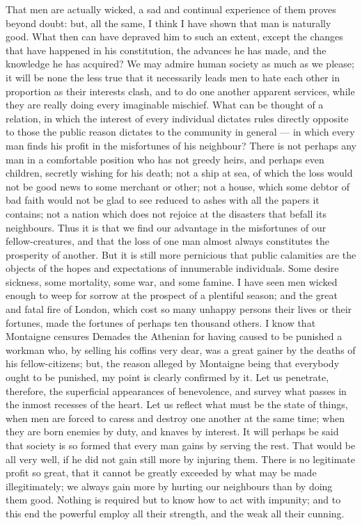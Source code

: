\documentclass[12pt]{report}
\begin{document}
 That men are actually wicked, a sad and continual experience of them proves beyond doubt: but, all the same, I think I have shown that man is naturally good. What then can have depraved him to such an extent, except the changes that have happened in his constitution, the advances he has made, and the knowledge he has acquired? We may admire human society as much as we please; it will be none the less true that it necessarily leads men to hate each other in proportion as their interests clash, and to do one another apparent services, while they are really doing every imaginable mischief. What can be thought of a relation, in which the interest of every individual dictates rules directly opposite to those the public reason dictates to the community in general — in which every man finds his profit in the misfortunes of his neighbour? There is not perhaps any man in a comfortable position who has not greedy heirs, and perhaps even children, secretly wishing for his death; not a ship at sea, of which the loss would not be good news to some merchant or other; not a house, which some debtor of bad faith would not be glad to see reduced to ashes with all the papers it contains; not a nation which does not rejoice at the disasters that befall its neighbours. Thus it is that we find our advantage in the misfortunes of our fellow-creatures, and that the loss of one man almost always constitutes the prosperity of another. But it is still more pernicious that public calamities are the objects of the hopes and expectations of innumerable individuals. Some desire sickness, some mortality, some war, and some famine. I have seen men wicked enough to weep for sorrow at the prospect of a plentiful season; and the great and fatal fire of London, which cost so many unhappy persons their lives or their fortunes, made the fortunes of perhaps ten thousand others. I know that Montaigne censures Demades the Athenian for having caused to be punished a workman who, by selling his coffins very dear, was a great gainer by the deaths of his fellow-citizens; but, the reason alleged by Montaigne being that everybody ought to be punished, my point is clearly confirmed by it. Let us penetrate, therefore, the superficial appearances of benevolence, and survey what passes in the inmost recesses of the heart. Let us reflect what must be the state of things, when men are forced to caress and destroy one another at the same time; when they are born enemies by duty, and knaves by interest. It will perhaps be said that society is so formed that every man gains by serving the rest. That would be all very well, if he did not gain still more by injuring them. There is no legitimate profit so great, that it cannot be greatly exceeded by what may be made illegitimately; we always gain more by hurting our neighbours than by doing them good. Nothing is required but to know how to act with impunity; and to this end the powerful employ all their strength, and the weak all their cunning.
\end{document}
